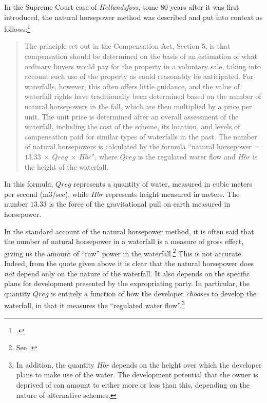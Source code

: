 In the Supreme Court case of \emph{Hellandsfoss}, some 80 years after it was first introduced, the natural horsepower method was described and put into context as follows:\footcite[1599]{hellandsfoss97}
\begin{quote}
The principle set out in the Compensation Act, Section 5, is that compensation should be determined on the basis of an estimation of what ordinary buyers would pay for the property in a voluntary sale, taking into account such use of the property as could reasonably be anticipated. For waterfalls, however, this often offers little guidance, and the value of waterfall rights have traditionally been determined based on the number of natural horsepowers in the fall, which are then multiplied by a price per unit. The unit price is determined after an overall assessment of the waterfall, including the cost of the scheme, its location, and levels of compensation paid for similar types of waterfalls in the past. The number of natural horsepowers is calculated by the formula ``natural horsepower = $13.33 \ \times \ Qreg \ \times \ Hbr$'', where $Qreg$ is the regulated water flow and $Hbr$ is the height of the waterfall.
\end{quote}

In this formula, $Qreg$ represents a quantity of water, measured in cubic meters per second (m3/sec), while $Hbr$ represents height measured in meters. The number $13.33$ is the force of the gravitational pull on earth measured in horsepower. 

In the standard account of the natural horsepower method, it is often said that the number of natural horsepower in a waterfall is a measure of gross effect, giving us the amount of ``raw'' power in the waterfall.\footnote{See \cite{vislie02}.} This is not accurate. Indeed, from the quote given above it is clear that the natural horsepower does {\it not} depend only on the nature of the waterfall. It also depends on the specific plans for development presented by the expropriating party. In particular, the quantity $Qreg$ is entirely a function of how the developer {\it chooses} to develop the waterfall, in that it measures the ``regulated water flow''.\footnote{In addition, the quantity $Hbr$ depends on the height over which the developer plans to make use of the water. The development potential that the owner is deprived of can amount to either more or less than this, depending on the nature of alternative schemes.}

